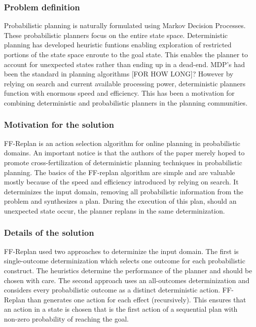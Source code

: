\documentclass[runningheads,a4paper]{llncs}
\begin{document}
\subsubsection{Problem definition}
Probabilistic planning is naturally formulated using Markov Decision Processes. These probabilistic planners focus on the entire state space. Deterministic planning has developed heuristic funtions enabling exploration of restricted portions of the state space enroute to the goal state. This enables the planner to account for unexpected states rather than ending up in a dead-end. MDP's had been the standard in planning algorithms [FOR HOW LONG]? However by relying on search and current available processing power, deterministic planners function with enormous speed and efficiency. This has been a motivation for combining deterministic and probabilistic planners in the planning communities.

\subsubsection{Motivation for the solution}
FF-Replan is an action selection algorithm for online planning in probabilistic domains. An important notice is that the authors of the paper merely hoped to promote cross-fertilization of deterministic planning techniques in probabilistic planning. The basics of the FF-replan algorithm are simple and are valuable mostly because of the speed and efficiency introduced by relying on search.  It determinizes the input domain, removing all probabilistic information from the problem and synthesizes a plan. During the execution of this plan, should an unexpected state occur, the planner replans in the same determinization.

\subsubsection{Details of the solution}
FF-Replan used two approaches to determinize the input domain. The first is single-outcome determinization which selects one outcome for each probabilistic construct. The heuristics determine the performance of the planner and should be chosen with care. The second approach uses an all-outcomes determinization and considers every probabilistic outcome as a distinct deterministic action. FF-Replan than generates one action for each effect (recursively). This ensures that an action in a state is chosen that is the first action of a sequential plan with non-zero probability of reaching the goal.
\end{document}

